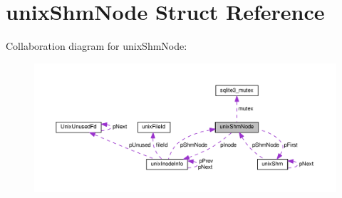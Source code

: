 \hypertarget{structunixShmNode}{}\section{unix\+Shm\+Node Struct Reference}
\label{structunixShmNode}


Collaboration diagram for unix\+Shm\+Node\+:\nopagebreak
\begin{figure}[H]
\begin{center}
\leavevmode
\includegraphics[width=350pt]{structunixShmNode__coll__graph}
\end{center}
\end{figure}
